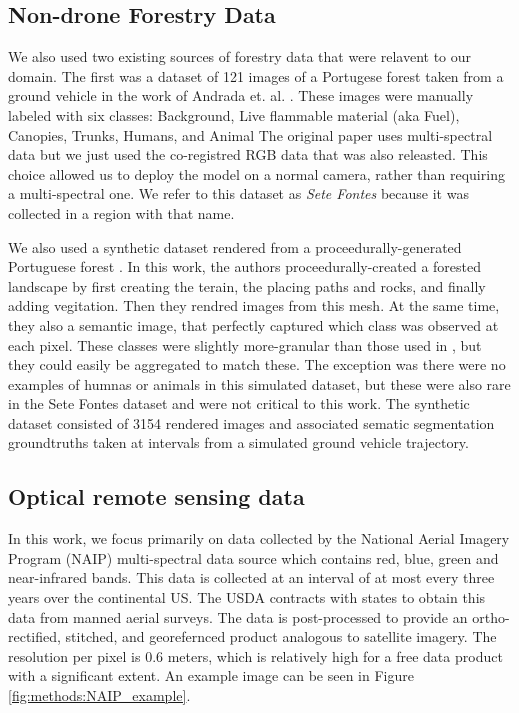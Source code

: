 \subsection{Non-drone Forestry Data}
We also used two existing sources of forestry data that were relavent to our domain. The first was a dataset of 121 images of a Portugese forest taken from a ground vehicle in the work of Andrada et. al. \cite{Andrada2020}. These images were manually labeled with six classes: Background, Live flammable material (aka Fuel), Canopies, Trunks, Humans, and Animal The original paper uses multi-spectral data but we just used the co-registred RGB data that was also releasted. This choice allowed us to deploy the model on a normal camera, rather than requiring a multi-spectral one. We refer to this dataset as \textit{Sete Fontes} because it was collected in a region with that name.

We also used a synthetic dataset rendered from a proceedurally-generated Portuguese forest \cite{nunes2021procedural}. In this work, the authors proceedurally-created a forested landscape by first creating the terain, the placing paths and rocks, and finally adding vegitation. Then they rendred images from this mesh. At the same time, they also a semantic image, that perfectly captured which class was observed at each pixel. These classes were slightly more-granular than those used in \cite{Andrada2020}, but they could easily be aggregated to match these. The exception was there were no examples of humnas or animals in this simulated dataset, but these were also rare in the Sete Fontes dataset and were not critical to this work. The synthetic dataset consisted of 3154 rendered images and associated sematic segmentation groundtruths taken at intervals from a simulated ground vehicle trajectory. 

\subsection{Optical remote sensing data}
In this work, we focus primarily on data collected by the National Aerial Imagery Program (NAIP) multi-spectral data source which contains red, blue, green and near-infrared bands. This data is collected at an interval of at most every three years over the continental US. The USDA contracts with states to obtain this data from manned aerial surveys. The data is post-processed to provide an ortho-rectified, stitched, and georefernced product analogous to satellite imagery. The resolution per pixel is 0.6 meters, which is relatively high for a free data product with a significant extent. An example image can be seen in Figure \ref{fig:methods:NAIP_example}.

